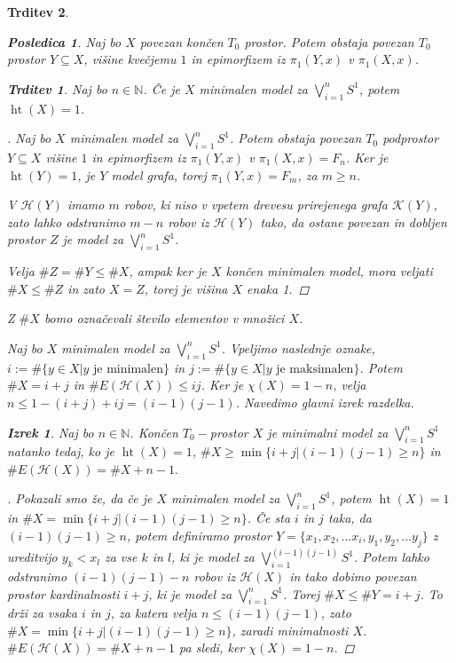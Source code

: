 \documentclass[a4paper,12pt]{article}
\DeclareRobustCommand{\k}{
    \mathcal{K}
}
\DeclareRobustCommand{\h}{
    \mathcal{H}
}
\DeclareMathOperator*{\htt}{ht}
\theoremstyle{definition}
\theoremstyle{plain}
\newtheorem{izrek}{Izrek}
\theoremstyle{definition}
\theoremstyle{plain}
\newtheorem{trditev}{Trditev}
\theoremstyle{plain}
\newtheorem{posledica}{Posledica}
\theoremstyle{plain}
\theoremstyle{plain}
\newenvironment{dokaz}{\begin{proof}[\bfseries\upshape\proofname]}{\end{proof}}
\begin{document}
\begin{trditev}
\begin{posledica}
    Naj bo $X$ povezan končen $T_0$ prostor. Potem obstaja povezan $T_0$ prostor $Y\subseteq X$, višine kvečjemu $1$ in epimorfizem iz $\pi_1(Y,x)$ v $\pi_1(X,x)$.
\end{posledica}

\begin{trditev}
    Naj bo $n\in\mathbb{N}$. Če je $X$ minimalen model za 
    $\bigvee\limits_{i=1}^{n}S^1$, potem $\htt(X)=1$.
\end{trditev}

\begin{dokaz}
    Naj bo $X$ minimalen model za $\bigvee\limits_{i=1}^{n}S^1$. Potem obstaja povezan $T_0$ podprostor $Y\subseteq X$ višine $1$ in epimorfizem iz $\pi_1(Y,x)$ v $\pi_1(X,x)=F_n$.
Ker je $\htt(Y)=1$, je $Y$ model grafa, torej $\pi_1(Y,x)=F_m$, za $m\geq n$.

    V $\h(Y)$ imamo $m$ robov, ki niso v vpetem drevesu prirejenega grafa $\k(Y)$, zato lahko odstranimo $m-n$ robov iz $\h(Y)$ tako, da ostane povezan in dobljen prostor $Z$ je model za $\bigvee\limits_{i=1}^{n}S^1$.

    Velja $\#Z=\#Y\leq \#X$, ampak ker je $X$ končen minimalen model, mora veljati $\#X\leq\#Z$ in zato $X=Z$, torej je višina $X$ enaka 1.
\end{dokaz}
Z $\# X$ bomo označevali število elementov v množici $X$.

Naj bo $X$ minimalen model za $\bigvee\limits_{i=1}^{n}S^1$. Vpeljimo naslednje oznake, $i:=\#\{y\in X| y \text{ je minimalen}\}$ in $j:=\#\{y\in X| y \text{ je maksimalen}\}$. Potem $\#X=i+j$ in $\#E(\h(X))\leq ij$. Ker je $\chi(X)=1-n$, velja $n\leq 1 - (i+j) + ij=(i-1)(j-1)$. Navedimo glavni izrek razdelka.

\begin{izrek}
    Naj bo $n\in\mathbb{N}$. Končen $T_0-$prostor $X$ je minimalni model za  $\bigvee\limits_{i=1}^{n}S^1$ natanko tedaj, ko je $\htt(X)=1$, $\#X\geq\min\{i+j|(i-1)(j-1)\geq n\}$ in $\#E(\h(X))= \#X + n -1.$
\end{izrek}

\begin{dokaz}
    Pokazali smo že, da če je $X$ minimalen model za $\bigvee\limits_{i=1}^{n}S^1$, potem $\htt(X)=1$ in $\#X=\min\{i+j|(i-1)(j-1)\geq n\}$. 
    Če sta $i$ in $j$ taka, da $(i-1)(j-1)\geq n$, potem definiramo prostor $Y=\{x_1,x_2,...x_i,y_1,y_2,...y_j\}$ z ureditvijo $y_k<x_l$ 
    za vse $k$ in $l$, ki je model za $\bigvee\limits_{i=1}^{(i-1)(j-1)}S^1$. Potem lahko odstranimo $(i-1)(j-1)-n$ robov iz $\h(X)$ in tako dobimo povezan prostor kardinalnosti $i+j$, ki je model za $\bigvee\limits_{i=1}^{n}S^1$. Torej $\#X\leq \#Y=i+j$. To drži za vsaka $i$ in $j$, za katera velja $n\leq (i-1)(j-1)$, zato $\#X=\min\{i+j|(i-1)(j-1)\geq n\}$, zaradi minimalnosti $X$. $\#E(\h(X))= \#X + n -1$ pa sledi, ker $\chi(X)= 1-n$.


\end{dokaz}
\end{trditev}
\end{document}
